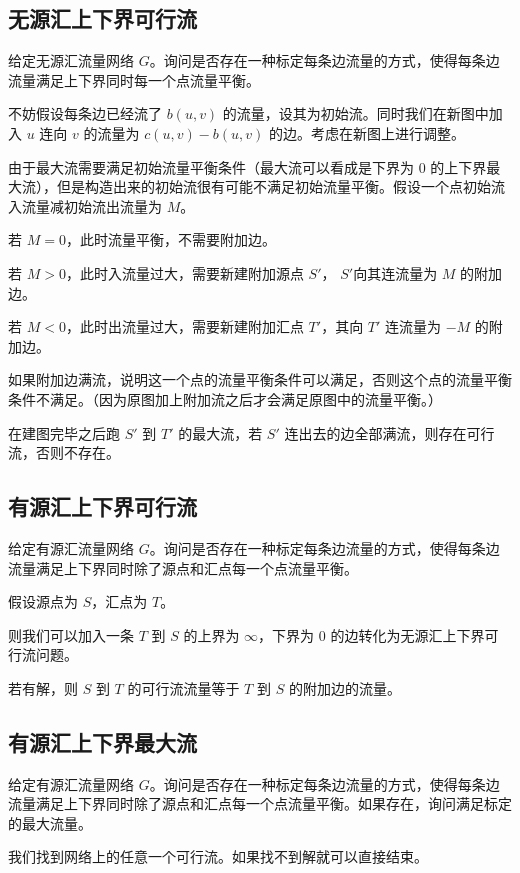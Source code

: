 \documentclass[9pt,landscape]{article}
\begin{document}
\begin{multicols}{2}
\subsection{无源汇上下界可行流}

给定无源汇流量网络 $G$。询问是否存在一种标定每条边流量的方式，使得每条边流量满足上下界同时每一个点流量平衡。

不妨假设每条边已经流了 $b(u,v)$ 的流量，设其为初始流。同时我们在新图中加入 $u$ 连向 $v$ 的流量为 $c(u,v)-b(u,v)$ 的边。考虑在新图上进行调整。

由于最大流需要满足初始流量平衡条件（最大流可以看成是下界为 $0$ 的上下界最大流），但是构造出来的初始流很有可能不满足初始流量平衡。假设一个点初始流入流量减初始流出流量为 $M$。

若 $M=0$，此时流量平衡，不需要附加边。

若 $M>0$，此时入流量过大，需要新建附加源点 $S'$， $S'$向其连流量为 $M$ 的附加边。

若 $M<0$，此时出流量过大，需要新建附加汇点 $T'$，其向 $T'$ 连流量为 $-M$ 的附加边。

如果附加边满流，说明这一个点的流量平衡条件可以满足，否则这个点的流量平衡条件不满足。（因为原图加上附加流之后才会满足原图中的流量平衡。）

在建图完毕之后跑 $S'$ 到 $T'$ 的最大流，若 $S'$ 连出去的边全部满流，则存在可行流，否则不存在。

\subsection{有源汇上下界可行流}

给定有源汇流量网络 $G$。询问是否存在一种标定每条边流量的方式，使得每条边流量满足上下界同时除了源点和汇点每一个点流量平衡。

假设源点为 $S$，汇点为 $T$。

则我们可以加入一条 $T$ 到 $S$ 的上界为 $\infty$，下界为 $0$ 的边转化为无源汇上下界可行流问题。

若有解，则 $S$ 到 $T$ 的可行流流量等于 $T$ 到 $S$ 的附加边的流量。

\subsection{有源汇上下界最大流}

给定有源汇流量网络 $G$。询问是否存在一种标定每条边流量的方式，使得每条边流量满足上下界同时除了源点和汇点每一个点流量平衡。如果存在，询问满足标定的最大流量。

我们找到网络上的任意一个可行流。如果找不到解就可以直接结束。


\end{multicols}
\end{document}
